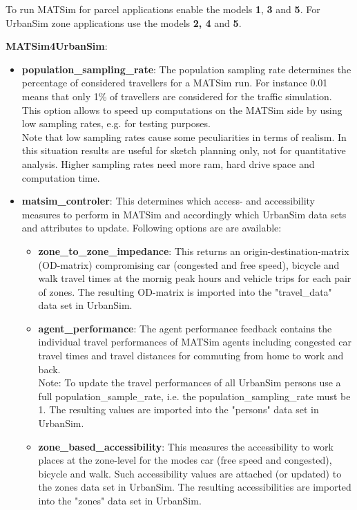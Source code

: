 \documentclass[a4paper,11pt]{report}
\begin{document}
To run MATSim for parcel applications enable the models \textbf{1},\textbf{ 3} and \textbf{5}. For UrbanSim zone applications use the models \textbf{2, 4} and \textbf{5}.

\textbf{MATSim4UrbanSim}:
\begin{itemize}
	\item \textbf{population\_sampling\_rate}: The population  sampling rate determines the percentage of considered travellers for a  MATSim run. For instance 0.01 means that only 1\% of travellers are  considered for the traffic simulation. This option allows to speed up  computations on the MATSim side by using low sampling rates, e.g. for  testing purposes.
\\   Note that low sampling rates cause some peculiarities in terms of  realism. In this situation results are useful for sketch planning only,  not for quantitative analysis. Higher sampling rates need more ram, hard  drive space and computation time.
	\item \textbf{matsim\_controler}: This determines which access-  and accessibility measures to perform in MATSim and accordingly which  UrbanSim data sets and attributes to update. Following options are are  available:   
\begin{itemize}
	\item \textbf{zone\_to\_zone\_impedance}: This returns an  origin-destination-matrix (OD-matrix) compromising car (congested and  free speed), bicycle and walk travel times at the mornig peak hours and  vehicle trips for each pair of zones. The resulting OD-matrix is  imported into the "travel\_data" data set in UrbanSim.
	\item \textbf{agent\_performance}: The agent performance  feedback contains the individual travel performances of MATSim agents  including congested car travel times and travel distances for commuting  from home to work and back.
\\     Note: To update the travel performances of all UrbanSim persons use a  full population\_sample\_rate, i.e. the population\_sampling\_rate must be  1. The resulting values are imported into the "persons" data set in  UrbanSim.
	\item \textbf{zone\_based\_accessibility}: This measures the  accessibility to work places at the zone-level for the modes car (free  speed and congested), bicycle and walk. Such accessibility values are  attached (or updated) to the zones data set in UrbanSim. The resulting  accessibilities are imported into the "zones" data set in UrbanSim.

\end{itemize}
\end{itemize}
\end{document}
